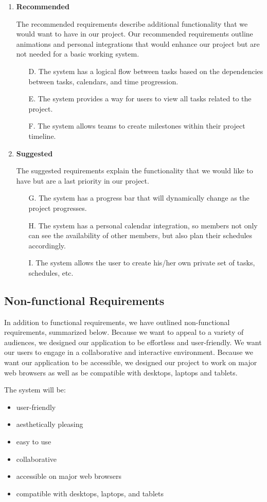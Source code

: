 \begin{enumerate}
\begin{enumerate}
	\end{enumerate}
\item \textbf{Recommended}
\par The recommended requirements describe additional functionality that we would want to have in our project. Our recommended requirements outline animations and personal integrations that would enhance our project but are not needed for a basic working system. 
	\begin{enumerate}
	\item[D.] The system has a logical flow between tasks based on the dependencies between tasks, calendars, and time progression. 
	\item[E.] The system provides a way for users to view all tasks related to the project.
	\item[F.] The system allows teams to create milestones within their project timeline.
	\end{enumerate}
\item \textbf{Suggested}
\par The suggested requirements explain the functionality that we would like to have but are a last priority in our project. 
	\begin{enumerate}
	\item[G.] The system has a progress bar that will dynamically change as the project progresses.
	\item[H.] The system has a personal calendar integration, so members not only can see the availability of other members, but also plan their schedules accordingly.
	\item[I.] The system allows the user to create his/her own private set of tasks, schedules, etc.
	\end{enumerate}
\end{enumerate}
\subsection{Non-functional Requirements}
In addition to functional requirements, we have outlined non-functional requirements, summarized below. Because we want to appeal to a variety of audiences, we designed our application to be effortless and user-friendly. We want our users to engage in a collaborative and interactive environment. Because we want our application to be accessible, we designed our project to work on major web browsers as well as be compatible with desktops, laptops and tablets.
\par The system will be:
\begin{itemize}
\item user-friendly
\item aesthetically pleasing
\item easy to use
\item collaborative
\item accessible on major web browsers
\item compatible with desktops, laptops, and tablets
\end{itemize}
